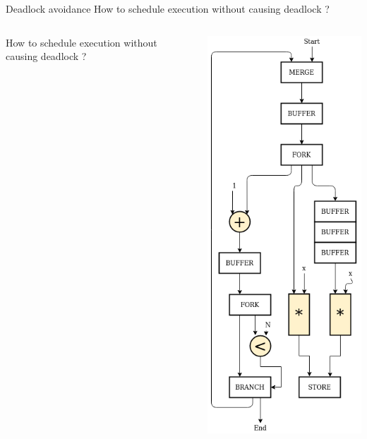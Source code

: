 \documentclass{beamer}
\begin{document}
\begin{frame}{Deadlock avoidance}
  How to schedule execution without causing deadlock ?
  \begin{columns}[T]
    \begin{column}{0.45\textwidth}
        How to schedule execution without causing deadlock ?
    \end{column}
    \begin{column}{0.1\textwidth}
    \end{column}
    \begin{column}{0.45\textwidth}
      \includegraphics[scale=0.25]{blocking_unshared.png}
    \end{column}
  \end{columns}
\end{frame}
\end{document}
